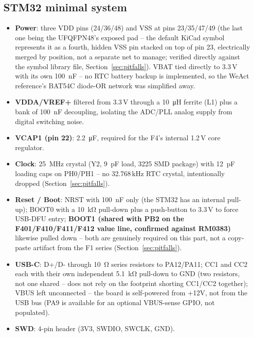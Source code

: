 \documentclass[11pt]{article}
\begin{document}
\subsection{STM32 minimal system}

\begin{itemize}
\item \textbf{Power}: three VDD pins (24/36/48) and VSS at pins 23/35/47/49 (the last one being the
  UFQFPN48's exposed pad -- the default KiCad symbol represents it as a fourth, hidden VSS pin stacked
  on top of pin 23, electrically merged by position, not a separate net to manage; verified directly
  against the symbol library file, Section~\ref{sec:pitfalls}). VBAT tied directly to 3.3\,V with its
  own \SI{100}{\nano\farad} -- no RTC battery backup is implemented, so the WeAct reference's
  BAT54C diode-OR network was simplified away.
\item \textbf{VDDA/VREF+} filtered from 3.3\,V through a \SI{10}{\micro\henry} ferrite (L1) plus a
  bank of \SI{100}{\nano\farad} decoupling, isolating the ADC/PLL analog supply from digital switching
  noise.
\item \textbf{VCAP1 (pin 22)}: \SI{2.2}{\micro\farad}, required for the F4's internal 1.2\,V core
  regulator.
\item \textbf{Clock}: \SI{25}{\mega\hertz} crystal (Y2, \SI{9}{\pico\farad} load, 3225 SMD package)
  with \SI{12}{\pico\farad} loading caps on PH0/PH1 -- no 32.768\,kHz RTC crystal, intentionally
  dropped (Section~\ref{sec:pitfalls}).
\item \textbf{Reset / Boot}: NRST with \SI{100}{\nano\farad} only (the STM32 has an internal pull-up);
  BOOT0 with a \SI{10}{\kilo\ohm} pull-down plus a push-button to 3.3\,V to force USB-DFU entry;
  \textbf{BOOT1 (shared with PB2 on the F401/F410/F411/F412 value line, confirmed against RM0383)}
  likewise pulled down -- both are genuinely required on this part, not a copy-paste artifact from the
  F1 series (Section~\ref{sec:pitfalls}).
\item \textbf{USB-C}: D+/D- through \SI{10}{\ohm} series resistors to PA12/PA11; CC1 and CC2 each with
  their own independent \SI{5.1}{\kilo\ohm} pull-down to GND (two resistors, not one shared -- does
  not rely on the footprint shorting CC1/CC2 together); VBUS left unconnected -- the board is
  self-powered from +12V, not from the USB bus (PA9 is available for an optional VBUS-sense GPIO, not
  populated).
\item \textbf{SWD}: 4-pin header (3V3, SWDIO, SWCLK, GND).
\end{itemize}
\end{document}
